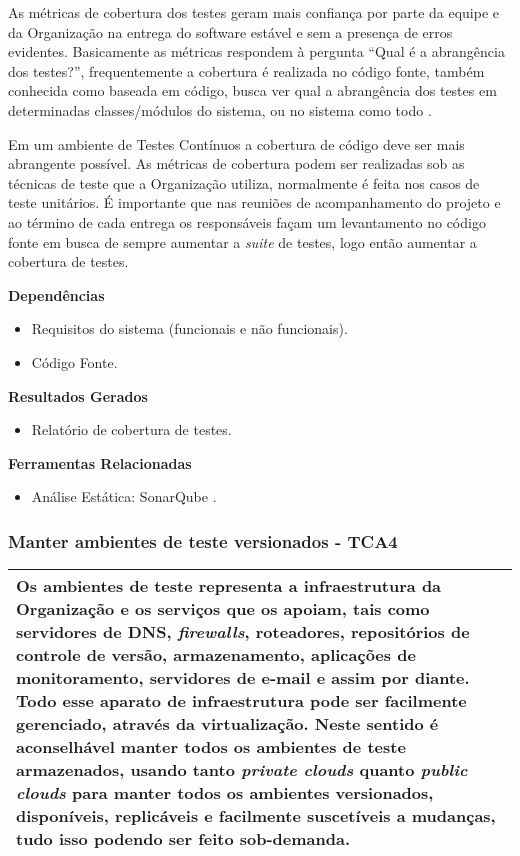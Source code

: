 As métricas de cobertura dos testes geram mais confiança por parte da equipe e da Organização na entrega do software estável e sem a presença de erros evidentes. Basicamente as métricas respondem à pergunta “Qual é a abrangência dos testes?”, frequentemente a cobertura é realizada no código fonte, também conhecida como baseada em código, busca ver qual a abrangência dos testes em determinadas classes/módulos do sistema, ou no sistema como todo \cite{RUP940320}.

Em um ambiente de Testes Contínuos a cobertura de código deve ser mais abrangente possível. As métricas de cobertura podem ser realizadas sob as técnicas de teste que a Organização utiliza, normalmente é feita nos casos de teste unitários. É importante que nas reuniões de acompanhamento do projeto e ao término de cada entrega os responsáveis façam um levantamento no código fonte em busca de sempre aumentar a \textit{suite} de testes, logo então aumentar a cobertura de testes.


\textbf{Dependências}
\begin{itemize}
    \item Requisitos do sistema (funcionais e não funcionais).
    \item Código Fonte.
\end{itemize}

\textbf{Resultados Gerados}
\begin{itemize}
    \item Relatório de cobertura de testes.

\end{itemize}

\textbf{Ferramentas Relacionadas}
\begin{itemize}
    \item Análise Estática: SonarQube \cite{SonarQube}.
\end{itemize}


\subsubsection{Manter ambientes de teste versionados - TCA4}
\label{sec:tca3}

\begin{table}[H]
\centering
\begin{tabular}{|p{130mm}|}
\hline
Os ambientes de teste representa a infraestrutura da Organização e os serviços que os apoiam, tais como servidores de DNS, \textit{firewalls}, roteadores, repositórios de controle de versão, armazenamento, aplicações de monitoramento, servidores de e-mail e assim por diante. Todo esse aparato de infraestrutura pode ser facilmente gerenciado, através da virtualização. Neste sentido é aconselhável manter todos os ambientes de teste armazenados, usando tanto \textit{private clouds} quanto \textit{public clouds} para manter todos os ambientes versionados, disponíveis, replicáveis e facilmente suscetíveis a mudanças, tudo isso podendo ser feito sob-demanda. \\ 
\hline
\end{tabular}
\end{table}

